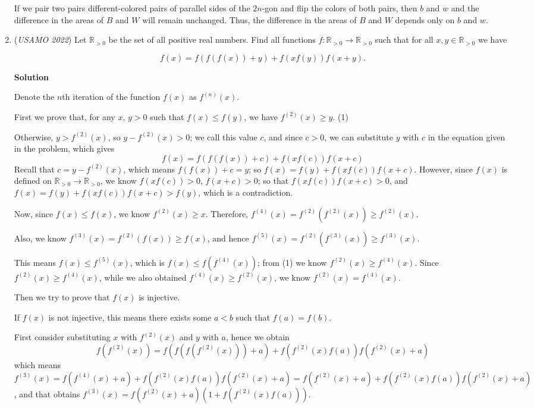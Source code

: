 \begin{enumerate}
 If we pair two pairs different-colored pairs of parallel sides of the $2n$-gon and flip the colors of both pairs, then $b$ and $w$ and the difference in the areas of $B$ and $W$ will remain unchanged. Thus, the difference in the areas of $B$ and $W$ depends only on $b$ and $w$.

 


	\item (\textit{USAMO 2022}) Let $\mathbb{R}_{>0}$ be the set of all positive real numbers. Find all functions $f:\mathbb{R}_{>0} \to \mathbb{R}_{>0}$ such that for all $x,y\in \mathbb{R}_{>0}$ we have

 \[f(x) = f(f(f(x)) + y) + f(xf(y)) f(x+y).\]




\textbf{Solution}

Denote the $n$th iteration of the function $f(x)$ as $f^{(n)}(x)$.

 First we prove that, for any $x$, $y>0$ such that $f(x)\leq f(y)$, we have $f^{(2)}(x)\geq y$. (1)

 Otherwise, $y>f^{(2)}(x)$, so $y-f^{(2)}(x)>0$; we call this value $c$, and since $c>0$, we can substitute $y$ with $c$ in the equation given in the problem, which gives 
 \[f(x)=f(f(f(x))+c)+f(xf(c))f(x+c)\] Recall that $c=y-f^{(2)}(x)$, which means $f(f(x))+c=y$; so $f(x)=f(y)+f(xf(c))f(x+c)$. However, since $f(x)$ is defined on $\mathbb{R}_{>0} \rightarrow \mathbb{R}_{>0}$, we know $f(xf(c))>0$, $f(x+c)>0$; so that $f(xf(c))f(x+c)>0$, and $f(x)=f(y)+f(xf(c))f(x+c)>f(y)$, which is a contradiction.

 
Now, since $f(x)\leq f(x)$, we know $f^{(2)}(x)\geq x$. Therefore, $f^{(4)}(x)=f^{(2)}(f^{(2)}(x))\geq f^{(2)}(x)$.

 Also, we know $f^{(3)}(x)=f^{(2)}(f(x))\geq f(x)$, and hence $f^{(5)}(x)=f^{(2)}(f^{(3)}(x)) \geq f^{(3)}(x)$.

 This means $f(x)\leq f^{(5)}(x)$, which is $f(x)\leq f(f^{(4)}(x))$; from (1) we know $f^{(2)}(x)\geq f^{(4)}(x)$. Since $f^{(2)}(x)\geq f^{(4)}(x)$, while we also obtained $f^{(4)}(x)\geq f^{(2)}(x)$, we know $f^{(2)}(x)=f^{(4)}(x)$.

 Then we try to prove that $f(x)$ is injective.

 If $f(x)$ is not injective, this means there exists some $a<b$ such that $f(a)=f(b)$.

 First consider substituting $x$ with $f^{(2)}(x)$ and $y$ with $a$, hence we obtain 
 \[f(f^{(2)}(x))=f(f(f(f^{(2)}(x)))+a)+f(f^{(2)}(x)f(a))f(f^{(2)}(x)+a)\] which means $f^{(3)}(x)=f(f^{(4)}(x)+a)+f(f^{(2)}(x)f(a))f(f^{(2)}(x)+a)=f(f^{(2)}(x)+a)+f(f^{(2)}(x)f(a))f(f^{(2)}(x)+a)$, and that obtains $f^{(3)}(x)=f(f^{(2)}(x)+a)(1+f(f^{(2)}(x)f(a)))$.


\end{enumerate}
